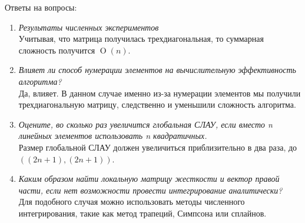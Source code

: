\documentclass{article}
\begin{document}
Ответы на вопросы:
\begin{enumerate}
    \item \textit{Результаты численных экспериментов} \\
    Учитывая, что матрица получилась трехдиагональная, то суммарная сложность получится $\operatorname{O}(n)$.
    \item \textit{Влияет ли способ нумерации элементов на вычислительную эффективность алгоритма?} \\
    Да, влияет. В данном случае именно из-за нумерации элементов мы получили трехдиагональную матрицу, следственно и уменьшили сложность алгоритма.
    \item \textit{Оцените, во сколько раз увеличится глобальная СЛАУ, если вместо n линейных элементов использовать n квадратичных.} \\
    Размер глобальной СЛАУ должен увеличиться приблизительно в два раза, до $\left( (2n + 1), (2n + 1)\right)$.
    \item \textit{Каким образом найти локальную матрицу жесткости и вектор правой части, если нет возможности провести интегрирование аналитически?} \\
    Для подобного случая можно использовать методы численного интегрирования, такие как метод трапеций, Симпсона или сплайнов.
\end{enumerate}
\end{document}
